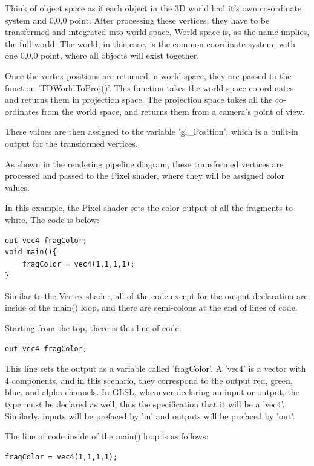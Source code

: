 \begin{fullwidth}
Think of object space as if each object in the 3D world had it's own co-ordinate system and 0,0,0 point. After processing these vertices, they have to be transformed and integrated into world space. World space is, as the name implies, the full world. The world, in this case, is the common coordinate system, with one 0,0,0 point, where all objects will exist together.

Once the vertex positions are returned in world space, they are passed to the function 'TDWorldToProj()'. This function takes the world space co-ordinates and returns them in projection space. The projection space takes all the co-ordinates from the world space, and returns them from a camera's point of view.

These values are then assigned to the variable 'gl\_Position', which is a built-in output for the transformed vertices.

As shown in the rendering pipeline diagram, these transformed vertices are processed and passed to the Pixel shader, where they will be assigned color values.

In this example, the Pixel shader sets the color output of all the fragments to white. The code is below: 

\begin{lstlisting}
out vec4 fragColor;
void main(){
	fragColor = vec4(1,1,1,1);
}
\end{lstlisting}

Similar to the Vertex shader, all of the code except for the output declaration are inside of the main() loop, and there are semi-colons at the end of lines of code. 

Starting from the top, there is this line of code:

\begin{lstlisting}
out vec4 fragColor;
\end{lstlisting}

This line sets the output as a variable called 'fragColor'. A 'vec4' is a vector with 4 components, and in this scenario, they correspond to the output red, green, blue, and alpha channels. In GLSL, whenever declaring an input or output, the type must be declared as well, thus the specification that it will be a 'vec4'. Similarly, inputs will be prefaced by 'in' and outputs will be prefaced by 'out'.

The line of code inside of the main() loop is as follows:

\begin{lstlisting}
fragColor = vec4(1,1,1,1);
\end{lstlisting}


\end{fullwidth}
